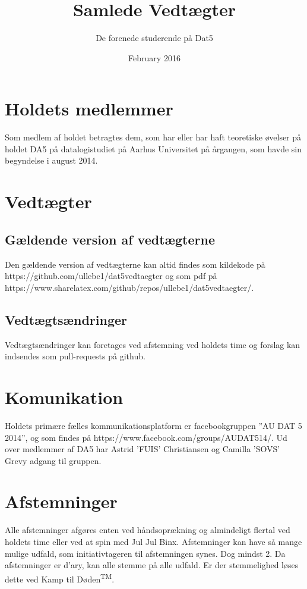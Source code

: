 \documentclass{article}
\title{Samlede Vedtægter}
\author{De forenede studerende på Dat5}
\date{February 2016}
\begin{document}
	
	\maketitle
	
	\section{Holdets medlemmer}
	Som medlem af holdet betragtes dem, som har eller har haft teoretiske øvelser på holdet DA5 på datalogistudiet på Aarhus Universitet på årgangen, som havde sin begyndelse i august 2014.
	
	\section{Vedtægter}
	\subsection{Gældende version af vedtægterne}
	Den gældende version af vedtægterne kan altid findes som kildekode på\\ https://github.com/ullebe1/dat5vedtaegter og som pdf på\\ https://www.sharelatex.com/github/repos/ullebe1/dat5vedtaegter/.
	\subsection{Vedtægtsændringer}
	Vedtægtsændringer kan foretages ved afstemning ved holdets time og forslag kan indsendes som pull-requests på github.
	
	\section{Komunikation}
	Holdets primære fælles kommunikationsplatform er facebookgruppen ”AU DAT 5 2014”, og som findes på https://www.facebook.com/groups/AUDAT514/. Ud over medlemmer af DA5 har Astrid 'FUIS' Christiansen og Camilla 'SOVS' Grevy adgang til gruppen.
	
	\section{Afstemninger}
	Alle afstemninger afgøres enten ved håndsoprækning og almindeligt flertal ved holdets time eller ved at spin med Jul Jul Binx. Afstemninger kan have så mange mulige udfald, som initiativtageren til afstemningen synes. Dog mindst 2. Da afstemninger er d'ary, kan alle stemme på alle udfald. Er der stemmelighed løses dette ved Kamp til Døden\textsuperscript{TM}.
\end{document}
